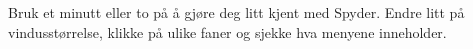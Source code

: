%
%
Bruk et minutt eller to på å gjøre deg litt kjent med Spyder. Endre litt på vindusstørrelse, klikke på ulike faner og sjekke hva menyene inneholder.
